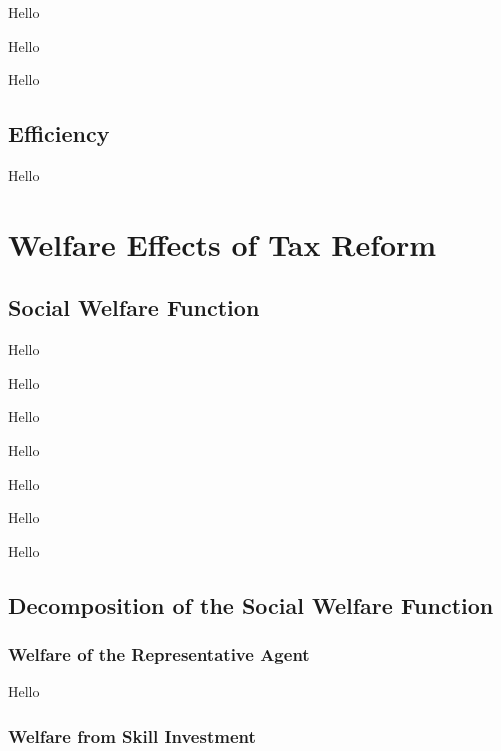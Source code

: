 \documentclass{article}
\begin{document}
{
\proposition Hello

}

{
\corollary Hello

}

{
\corollary Hello

}

\subsection{Efficiency}

{
\proposition Hello

}

\section{Welfare Effects of Tax Reform}



\subsection{Social Welfare Function}



{
\proposition Hello

}

{
\corollary Hello

}

{
\corollary Hello

}

{
\corollary Hello

}

{
\corollary Hello

}

{
\corollary Hello

}

{
\corollary Hello

}

\subsection{Decomposition of the Social Welfare Function}

\subsubsection{Welfare of the Representative Agent}

{
\proposition Hello

}

\subsubsection{Welfare from Skill Investment}
\end{document}
